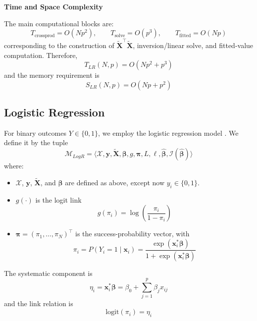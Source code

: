 \textbf{Time and Space Complexity}

The main computational blocks are:
\begin{equation}
    T_{\text{crossprod}} = O(Np^2), \qquad
    T_{\text{solve}} = O(p^3), \qquad
    T_{\text{fitted}} = O(Np)
\end{equation}
corresponding to the construction of $\tilde{\mathbf{X}}^\top \tilde{\mathbf{X}}$, inversion/linear solve, and fitted-value computation. Therefore,
\begin{equation}
    T_{LR}(N,p) = O(Np^2 + p^3)
\end{equation}
and the memory requirement is
\begin{equation}
    S_{LR}(N,p) = O(Np + p^2)
\end{equation}

\subsection{Logistic Regression}
For binary outcomes $Y \in \{0, 1\}$, we employ the logistic regression model \cite{hosmer2013}. We define it by the tuple
\begin{equation}
    \mathcal{M}_{LogR} = \langle \mathcal{X}, \mathbf{y}, \tilde{\mathbf{X}}, \boldsymbol{\beta}, g, \boldsymbol{\pi}, L, \ell, \hat{\boldsymbol{\beta}}, \mathcal{I}(\hat{\boldsymbol{\beta}}) \rangle
\end{equation}
where:
\begin{itemize}
    \item $\mathcal{X}$, $\mathbf{y}$, $\tilde{\mathbf{X}}$, and $\boldsymbol{\beta}$ are defined as above, except now $y_i \in \{0,1\}$.
    \item $g(\cdot)$ is the logit link
    \begin{equation}
        g(\pi_i) = \log\left(\frac{\pi_i}{1-\pi_i}\right)
    \end{equation}
    \item $\boldsymbol{\pi} = (\pi_1,\dots,\pi_N)^\top$ is the success-probability vector, with
    \begin{equation}
        \pi_i = P(Y_i = 1 \mid \mathbf{x}_i) = \frac{\exp(\mathbf{x}_i^\ast \boldsymbol{\beta})}{1+\exp(\mathbf{x}_i^\ast \boldsymbol{\beta})}
    \end{equation}
\end{itemize}

The systematic component is
\begin{equation}
    \eta_i = \mathbf{x}_i^\ast \boldsymbol{\beta} = \beta_0 + \sum_{j=1}^{p}\beta_j x_{ij}
\end{equation}
and the link relation is
\begin{equation}
    \text{logit}(\pi_i) = \eta_i
\end{equation}

